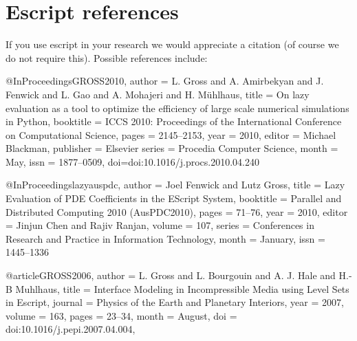 
%
%
%

\chapter{Escript references}
\label{app:ourrefs}

If you use escript in your research we would appreciate a citation (of course
we do not require this). Possible references include:

\begin{shellCode}
@InProceedings{GROSS2010,
	author = {L. Gross and A. Amirbekyan and J. Fenwick and L. Gao 
	    and A. Mohajeri and H. M\"uhlhaus},
	title = {On lazy evaluation as a tool to optimize the 
	    efficiency of large scale numerical simulations in Python},
	booktitle = {ICCS 2010: Proceedings of the International 
	    Conference on Computational Science},
	pages = {2145--2153},
	year = {2010},
	editor = {Michael Blackman},
	publisher = {Elsevier}
	series = {Procedia Computer Science},
	month = {May},
	issn = {1877--0509},
	doi={doi:10.1016/j.procs.2010.04.240}
}
\end{shellCode}


\begin{shellCode}
@InProceedings{lazyauspdc,
	author = {Joel Fenwick and Lutz Gross},
	title = {Lazy Evaluation of PDE Coefficients in the EScript System},
	booktitle = {Parallel and Distributed Computing 2010 (AusPDC2010)},
	pages = {71--76},
	year = {2010},
	editor = {Jinjun Chen and Rajiv Ranjan},
	volume = {107},
	series = {Conferences in Research and Practice in Information Technology},
	month = {January},
	issn = {1445--1336}
}
\end{shellCode}

\begin{shellCode}
@article{GROSS2006,
        author = {L. Gross and L. Bourgouin and A. J. Hale and H.-B Muhlhaus},
        title = {Interface Modeling in Incompressible Media 
	using Level Sets in Escript},
        journal = {Physics of the Earth and Planetary Interiors},
        year = 2007,
        volume = {163},
        pages = {23--34},
        month = {August},
        doi = {doi:10.1016/j.pepi.2007.04.004},
}
\end{shellCode}

